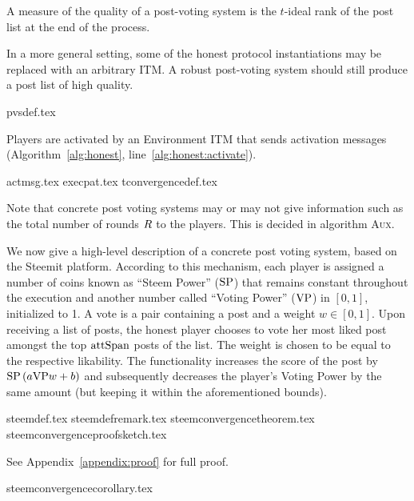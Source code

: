    A measure of the quality of a post-voting system is the $t$-ideal rank of
    the post list at the end of the process.

    In a more general setting, some of the honest protocol instantiations may be
    replaced with an arbitrary ITM. A robust post-voting system should still
    produce a post list of high quality.

    {pvsdef.tex}

    \noindent Players are activated by an Environment ITM that sends activation
    messages (Algorithm~\ref{alg:honest}, line~\ref{alg:honest:activate}).

    {actmsg.tex}
    {execpat.tex}
    {tconvergencedef.tex}

    \noindent Note that concrete post voting systems may or may not give
    information such as the total number of rounds $R$ to the players.
    This is decided in algorithm \textsc{Aux}.

    We now give a high-level description of a concrete post voting system, based
    on the Steemit platform. According to this mechanism, each player is
    assigned a number of coins known as ``Steem Power'' ($\mathrm{SP}$) that remains
    constant throughout the execution and another number called ``Voting Power''
    ($\mathrm{VP}$) in $\left[0, 1\right]$, initialized to 1. A vote is a pair
    containing a post and a weight $w \in \left[0, 1\right]$. Upon receiving a
    list of posts, the honest player chooses to vote her most liked post amongst
    the top $\mathrm{attSpan}$ posts of the list. The weight is chosen to be equal to
    the respective likability. The functionality increases the score of the post
    by $\mathrm{SP}\left(a \mathrm{VP} w + b\right)$ and subsequently decreases the
    player's Voting Power by the same amount (but keeping it within the
    aforementioned bounds).

    {steemdef.tex}
    {steemdefremark.tex}
    {steemconvergencetheorem.tex}
    {steemconvergenceproofsketch.tex}

    See Appendix~\ref{appendix:proof} for full proof.

    {steemconvergencecorollary.tex}
